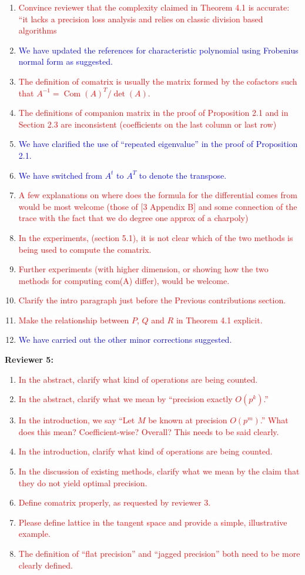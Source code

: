 \documentclass{sig-alternate-05-2015}
\DeclareMathOperator{\com}{Com}
\newcommand{\done}[1]{\textcolor{blue}{#1}}
\newcommand{\tdo}[1]{\textcolor{red}{#1}}
\begin{document}
\begin{enumerate}
\item \tdo{Convince reviewer that the complexity claimed in Theorem 4.1 is accurate: ``it lacks a precision loss analysis and relies on classic division based algorithms}
\item \done{We have updated the references for characteristic polynomial using Frobenius normal form as suggested.}
\item \tdo{The definition of comatrix is usually the matrix formed by the cofactors such that $A^{-1} = \com(A)^T / \det(A)$.}
\item \tdo{The definitions of companion matrix in the proof of Proposition 2.1 and in Section 2.3 are inconsistent (coefficients on the last column or last row)}
\item \done{We have clarified the use of ``repeated eigenvalue'' in the proof of Proposition 2.1.}
\item \done{We have switched from $A^t$ to $A^T$ to denote the transpose.}
\item \tdo{A few explanations on where does the formula for the differential comes from
would be most welcome (those of [3 Appendix B] and some connection of the trace
with the fact that we do degree one approx of a charpoly)}
\item \tdo{In the experiments, (section 5.1), it is not clear which of the two methods is being used to compute the comatrix.}
\item \tdo{Further experiments (with higher dimension, or showing how the two methods for computing com(A) differ), would be welcome.}
\item \tdo{Clarify the intro paragraph just before the Previous contributions section.}
\item \tdo{Make the relationship between $P$, $Q$ and $R$ in Theorem 4.1 explicit.}
\item \done{We have carried out the other minor corrections suggested.}
\end{enumerate}
\textbf{Reviewer 5:}
\begin{enumerate}
\item \tdo{In the abstract, clarify what kind of operations are being counted.}
\item \tdo{In the abstract, clarify what we mean by ``precision exactly $O(p^k)$.''}
\item \tdo{In the introduction, we say ``Let $M$ be known at precision $O(p^m)$.''  What does this mean?  Coefficient-wise?  Overall?  This needs to be said clearly.}
\item \tdo{In the introduction, clarify what kind of operations are being counted.}
\item \tdo{In the discussion of existing methods, clarify what we mean by the claim that they do not yield optimal precision.}
\item \tdo{Define comatrix properly, as requested by reviewer 3.}
\item \tdo{Please define lattice in the tangent space and provide a simple, illustrative example.}
\item \tdo{The definition of ``flat precision'' and ``jagged precision'' both need to be more clearly defined.}
\end{enumerate}
\end{document}
